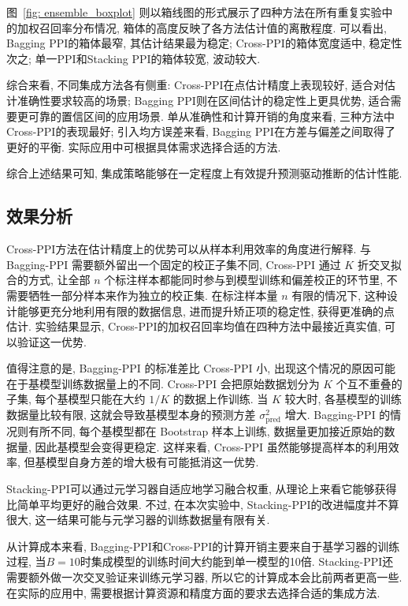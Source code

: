 \documentclass[a4paper, AutoFakeBold, UTF8]{ctexrep}
\theoremstyle{plain}
\numberwithin{equation}{chapter}
\begin{document}
图~\ref{fig: ensemble_boxplot} 则以箱线图的形式展示了四种方法在所有重复实验中的加权召回率分布情况, 箱体的高度反映了各方法估计值的离散程度. 可以看出, Bagging PPI的箱体最窄, 其估计结果最为稳定; Cross-PPI的箱体宽度适中, 稳定性次之; 单一PPI和Stacking PPI的箱体较宽, 波动较大. 

综合来看, 不同集成方法各有侧重: Cross-PPI在点估计精度上表现较好, 适合对估计准确性要求较高的场景; Bagging PPI则在区间估计的稳定性上更具优势, 适合需要更可靠的置信区间的应用场景. 单从准确性和计算开销的角度来看, 三种方法中Cross-PPI的表现最好; 引入均方误差来看, Bagging PPI在方差与偏差之间取得了更好的平衡. 实际应用中可根据具体需求选择合适的方法. 

综合上述结果可知, 集成策略能够在一定程度上有效提升预测驱动推断的估计性能. 


\subsection{效果分析}
Cross-PPI方法在估计精度上的优势可以从样本利用效率的角度进行解释. 与 Bagging-PPI 需要额外留出一个固定的校正子集不同, Cross-PPI 通过 $K$ 折交叉拟合的方式, 让全部 $n$ 个标注样本都能同时参与到模型训练和偏差校正的环节里, 不需要牺牲一部分样本来作为独立的校正集. 在标注样本量 $n$ 有限的情况下, 这种设计能够更充分地利用有限的数据信息, 进而提升矫正项的稳定性, 获得更准确的点估计. 实验结果显示, Cross-PPI的加权召回率均值在四种方法中最接近真实值, 可以验证这一优势. 

值得注意的是, Bagging-PPI 的标准差比 Cross-PPI 小, 出现这个情况的原因可能在于基模型训练数据量上的不同. Cross-PPI 会把原始数据划分为 $K$ 个互不重叠的子集, 每个基模型只能在大约 $1/K$ 的数据上作训练. 当 $K$ 较大时, 各基模型的训练数据量比较有限, 这就会导致基模型本身的预测方差 $\sigma_{\text{pred}}^2$ 增大. Bagging-PPI 的情况则有所不同, 每个基模型都在 Bootstrap 样本上训练, 数据量更加接近原始的数据量, 因此基模型会变得更稳定. 这样来看, Cross-PPI 虽然能够提高样本的利用效率, 但基模型自身方差的增大极有可能抵消这一优势. 

Stacking-PPI可以通过元学习器自适应地学习融合权重, 从理论上来看它能够获得比简单平均更好的融合效果. 不过, 在本次实验中, Stacking-PPI的改进幅度并不算很大, 这一结果可能与元学习器的训练数据量有限有关. 

从计算成本来看, Bagging-PPI和Cross-PPI的计算开销主要来自于基学习器的训练过程, 当$B=10$时集成模型的训练时间大约能到单一模型的10倍. Stacking-PPI还需要额外做一次交叉验证来训练元学习器, 所以它的计算成本会比前两者更高一些. 在实际的应用中, 需要根据计算资源和精度方面的要求去选择合适的集成方法. 
\end{document}
